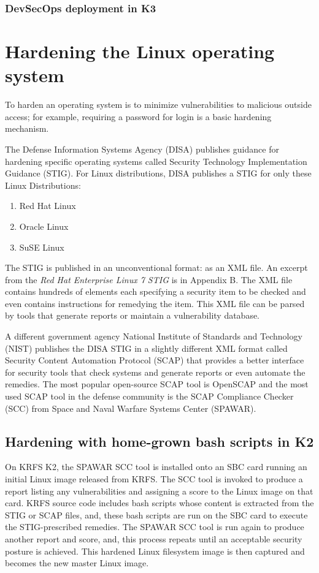\documentclass[12pt]{article}
\begin{document}
\subsubsection{DevSecOps deployment in K3}



%
\newpage
\section{Hardening the Linux operating system}
\label{sec:image_hardening}

To harden an operating system is to minimize vulnerabilities to malicious
outside access; for example, requiring a password for login is a basic hardening
mechanism.

The Defense Information Systems Agency (DISA) publishes guidance for hardening
specific operating systems called Security Technology Implementation Guidance
(STIG).  For Linux distributions, DISA publishes a STIG for only these Linux
Distributions:
\begin{enumerate}
    \item Red Hat Linux
    \item Oracle Linux
    \item SuSE Linux
\end{enumerate}

The STIG is published in an unconventional format: as an XML file.  An excerpt
from the \emph{Red Hat Enterprise Linux 7 STIG} is in Appendix B.  The XML file
contains hundreds of elements each specifying a security item to be checked
and even contains instructions for remedying the item.  This XML file can be
parsed by tools that generate reports or maintain a vulnerability database.

A different government agency National Institute of Standards and Technology
(NIST) publishes the DISA STIG in a slightly different XML format called
Security Content Automation Protocol (SCAP) that provides a better interface for
security tools that check systems and generate reports or even automate the
remedies.  The most popular open-source SCAP tool is OpenSCAP and the most used
SCAP tool in the defense community is the SCAP Compliance Checker (SCC) from
Space and Naval Warfare Systems Center (SPAWAR).

\subsection{Hardening with home-grown bash scripts in K2}
On KRFS K2, the SPAWAR SCC tool is installed onto an SBC card running an initial
Linux image released from KRFS.  The SCC tool is invoked to produce a report
listing any vulnerabilities and assigning a score to the Linux image on that
card.  KRFS source code includes bash scripts whose content is extracted from
the STIG or SCAP files, and, these bash scripts are run on the SBC card to
execute the STIG-prescribed remedies.  The SPAWAR SCC tool is run again to
produce another report and score, and, this process repeats until an acceptable
security posture is achieved.  This hardened Linux filesystem image is then
captured and becomes the new master Linux image.
\end{document}
